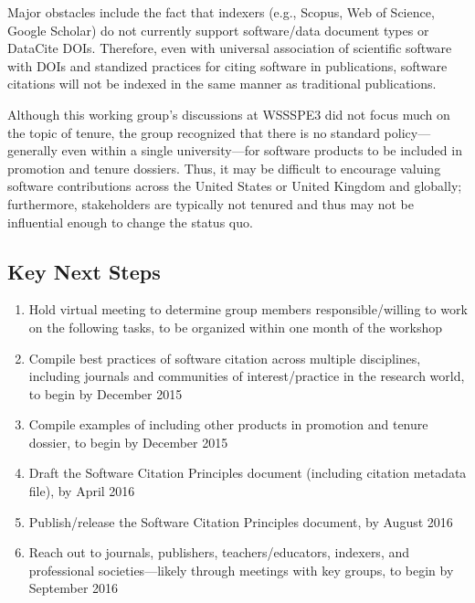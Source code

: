 Major obstacles include the fact that indexers (e.g., Scopus, Web of Science,  Google Scholar) do not currently support software/data document types or  DataCite DOIs.
Therefore, even with universal association of scientific software with DOIs  and standized practices for citing software in publications, software citations will not be indexed in the same manner as traditional publications.

Although this working group's discussions at WSSSPE3 did not focus much on the topic of tenure, the group recognized that there is no standard policy---generally even within a single university---for software products to be included in promotion and tenure dossiers.
Thus, it may be difficult to encourage valuing software contributions across the United States or United Kingdom and globally; furthermore, stakeholders are typically not tenured and thus may not be influential enough to change the status quo.

\subsection{Key Next Steps}
\label{SC:next-steps}

\begin{enumerate}
\item Hold virtual meeting to determine group members responsible\slash willing to work on the following tasks, to be organized within one month of the workshop
\item Compile best practices of software citation across multiple disciplines, including journals and communities of interest\slash practice in the research world, to begin by December 2015
\item Compile examples of including other products in promotion and tenure dossier, to begin by December 2015
\item Draft the Software Citation Principles document (including citation metadata file), by April 2016
\item Publish\slash release the Software Citation Principles document, by August 2016
\item Reach out to journals, publishers, teachers\slash educators, indexers, and professional societies---likely through meetings with key groups, to begin by September 2016

\end{enumerate}

